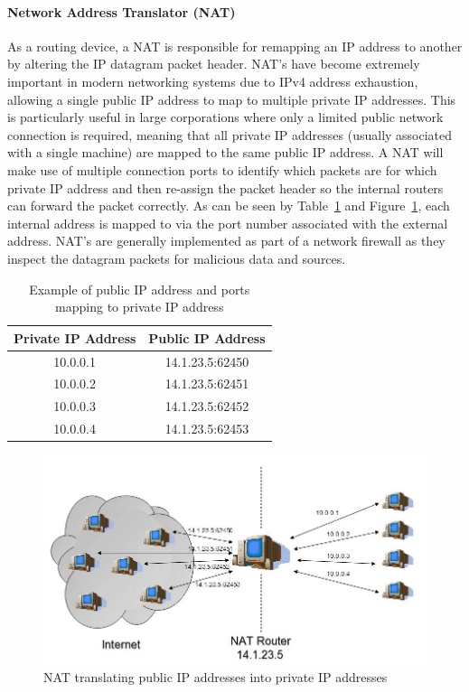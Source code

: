 \documentclass[final_report.tex]{subfiles}
\begin{document}
\paragraph*{Network Address Translator (NAT)}
As a routing device, a NAT is responsible for remapping an IP address to another by altering the IP datagram packet header. NAT's have become extremely important in modern networking systems due to IPv4 address exhaustion, allowing a single public IP address to map to multiple private IP addresses. This is particularly useful in large corporations where only a limited public network connection is required, meaning that all private IP addresses (usually associated with a single machine) are mapped to the same public IP address. A NAT will make use of multiple connection ports to identify which packets are for which private IP address and then re-assign the packet header so the internal routers can forward the packet correctly. As can be seen by Table~\ref{tab:ip} and Figure~\ref{fig:nat}, each internal address is mapped to via the port number associated with the external address. NAT's are generally implemented as part of a network firewall as they inspect the datagram packets for malicious data and sources.

\begin{table}[H]
	\centering
	\begin{tabular} { | c | c | }
		\hline
		\textbf{Private IP Address} & \textbf{Public IP Address} \\
		\hline
		10.0.0.1 & 14.1.23.5:62450 \\
		\hline
		10.0.0.2 & 14.1.23.5:62451 \\
		\hline
		10.0.0.3 & 14.1.23.5:62452 \\
		\hline
		10.0.0.4 & 14.1.23.5:62453 \\
		\hline
	\end{tabular}
	\caption{Example of public IP address and ports mapping to private IP address}
	\label{tab:ip}
\end{table}

\begin{figure}[H]
	\centering
	\includegraphics[width=\textwidth]{img/nat.jpg}
	\caption{NAT translating public IP addresses into private IP addresses \cite{nat-table}}
	\label{fig:nat}
\end{figure}
\end{document}
